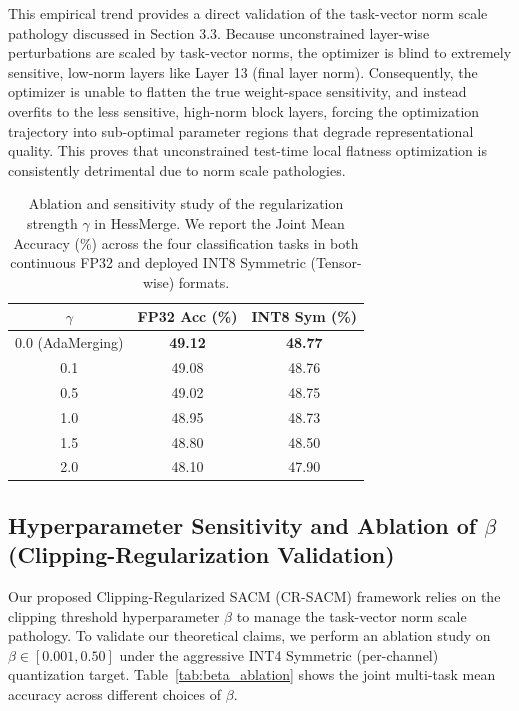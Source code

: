 This empirical trend provides a direct validation of the task-vector norm scale pathology discussed in Section 3.3. Because unconstrained layer-wise perturbations are scaled by task-vector norms, the optimizer is blind to extremely sensitive, low-norm layers like Layer 13 (final layer norm). Consequently, the optimizer is unable to flatten the true weight-space sensitivity, and instead overfits to the less sensitive, high-norm block layers, forcing the optimization trajectory into sub-optimal parameter regions that degrade representational quality. This proves that unconstrained test-time local flatness optimization is consistently detrimental due to norm scale pathologies.

\begin{table}[h]
\caption{Ablation and sensitivity study of the regularization strength $\gamma$ in HessMerge. We report the Joint Mean Accuracy (\%) across the four classification tasks in both continuous FP32 and deployed INT8 Symmetric (Tensor-wise) formats.}
\label{tab:gamma_ablation}
\begin{center}
\begin{small}
\begin{sc}
\begin{tabular}{ccc}
\toprule
$\gamma$ & FP32 Acc (\%) & INT8 Sym (\%) \\
\midrule
0.0 (AdaMerging) & \textbf{49.12} & \textbf{48.77} \\
0.1 & 49.08 & 48.76 \\
0.5 & 49.02 & 48.75 \\
1.0 & 48.95 & 48.73 \\
1.5 & 48.80 & 48.50 \\
2.0 & 48.10 & 47.90 \\
\bottomrule
\end{tabular}
\end{sc}
\end{small}
\end{center}
\end{table}

\subsection{Hyperparameter Sensitivity and Ablation of $\beta$ (Clipping-Regularization Validation)}
Our proposed Clipping-Regularized SACM (CR-SACM) framework relies on the clipping threshold hyperparameter $\beta$ to manage the task-vector norm scale pathology. To validate our theoretical claims, we perform an ablation study on $\beta \in [0.001, 0.50]$ under the aggressive INT4 Symmetric (per-channel) quantization target. Table~\ref{tab:beta_ablation} shows the joint multi-task mean accuracy across different choices of $\beta$.

